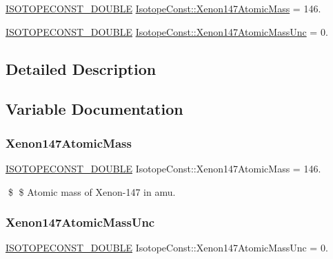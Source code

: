 \begin{DoxyCompactItemize}
\item 
\mbox{\hyperlink{group___isotope_const-_macros_ga8f45a7272ce02c0b4c65c44636ed719a}{I\+S\+O\+T\+O\+P\+E\+C\+O\+N\+S\+T\+\_\+\+D\+O\+U\+B\+LE}} \mbox{\hyperlink{group___isotope_const-_xenon-_xe147_ga81da828ee189981a3f5bb4ab48a0366e}{Isotope\+Const\+::\+Xenon147\+Atomic\+Mass}} = 146.
\item 
\mbox{\hyperlink{group___isotope_const-_macros_ga8f45a7272ce02c0b4c65c44636ed719a}{I\+S\+O\+T\+O\+P\+E\+C\+O\+N\+S\+T\+\_\+\+D\+O\+U\+B\+LE}} \mbox{\hyperlink{group___isotope_const-_xenon-_xe147_gafad5147847ce349a7f6b59a1e13a0e01}{Isotope\+Const\+::\+Xenon147\+Atomic\+Mass\+Unc}} = 0.
\end{DoxyCompactItemize}


\subsection{Detailed Description}


\subsection{Variable Documentation}
\mbox{\label{group___isotope_const-_xenon-_xe147_ga81da828ee189981a3f5bb4ab48a0366e}} 
\subsubsection{\texorpdfstring{Xenon147\+Atomic\+Mass}{Xenon147AtomicMass}}
{\footnotesize\ttfamily \mbox{\hyperlink{group___isotope_const-_macros_ga8f45a7272ce02c0b4c65c44636ed719a}{I\+S\+O\+T\+O\+P\+E\+C\+O\+N\+S\+T\+\_\+\+D\+O\+U\+B\+LE}} Isotope\+Const\+::\+Xenon147\+Atomic\+Mass = 146.}

\$ \$ Atomic mass of Xenon-\/147 in amu. \mbox{\label{group___isotope_const-_xenon-_xe147_gafad5147847ce349a7f6b59a1e13a0e01}} 
\subsubsection{\texorpdfstring{Xenon147\+Atomic\+Mass\+Unc}{Xenon147AtomicMassUnc}}
{\footnotesize\ttfamily \mbox{\hyperlink{group___isotope_const-_macros_ga8f45a7272ce02c0b4c65c44636ed719a}{I\+S\+O\+T\+O\+P\+E\+C\+O\+N\+S\+T\+\_\+\+D\+O\+U\+B\+LE}} Isotope\+Const\+::\+Xenon147\+Atomic\+Mass\+Unc = 0.}

